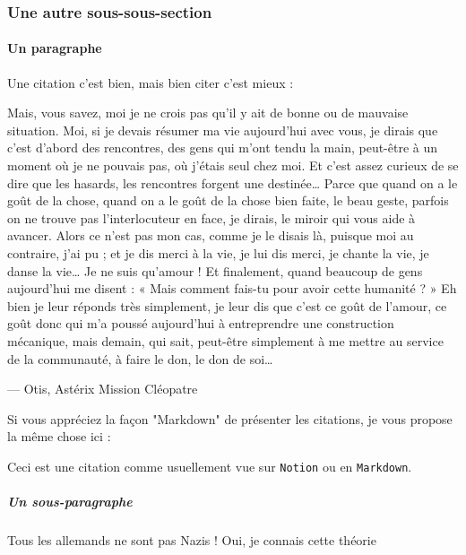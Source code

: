 \subsubsection{Une autre sous-sous-section}
\paragraph{Un paragraphe}
Une citation c'est bien, mais bien citer c'est mieux :

\begin{quoting}
    Mais, vous savez, moi je ne crois pas qu’il y ait de bonne ou de mauvaise situation. Moi, si je devais résumer ma vie aujourd’hui avec vous, je dirais que c’est d’abord des rencontres, des gens qui m’ont tendu la main, peut-être à un moment où je ne pouvais pas, où j’étais seul chez moi. Et c’est assez curieux de se dire que les hasards, les rencontres forgent une destinée… Parce que quand on a le goût de la chose, quand on a le goût de la chose bien faite, le beau geste, parfois on ne trouve pas l’interlocuteur en face, je dirais, le miroir qui vous aide à avancer. Alors ce n’est pas mon cas, comme je le disais là, puisque moi au contraire, j’ai pu ; et je dis merci à la vie, je lui dis merci, je chante la vie, je danse la vie… Je ne suis qu’amour ! Et finalement, quand beaucoup de gens aujourd’hui me disent : « Mais comment fais-tu pour avoir cette humanité ? » Eh bien je leur réponds très simplement, je leur dis que c’est ce goût de l’amour, ce goût donc qui m’a poussé aujourd’hui à entreprendre une construction mécanique, mais demain, qui sait, peut-être simplement à me mettre au service de la communauté, à faire le don, le don de soi…
    \begin{flushright}
        --- Otis, Astérix Mission Cléopatre
    \end{flushright}
\end{quoting}

Si vous appréciez la façon "Markdown" de présenter les citations, je vous propose la même chose ici :
\begin{quoted}
    Ceci est une citation comme usuellement vue sur \texttt{Notion} ou en \texttt{Markdown}.
\end{quoted}

\subparagraph{Un sous-paragraphe}

\begin{dialogue}
      Tous les allemands ne sont pas Nazis !
     Oui, je connais cette théorie
\end{dialogue}

